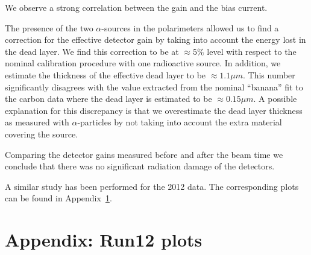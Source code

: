 \documentclass[a4paper,12pt]{article}
\begin{document}
We observe a strong correlation between the gain and the bias current.

The presence of the two $\alpha$-sources in the polarimeters allowed us to find
a correction for the effective detector gain by taking into account the energy
lost in the dead layer. We find this correction to be at $\approx 5\%$ level
with respect to the nominal calibration procedure with one radioactive source.
In addition, we estimate the thickness of the effective dead layer to be
$\approx 1.1\mu m$. This number significantly disagrees with the value extracted
from the nominal ``banana'' fit to the carbon data where the dead layer is
estimated to be $\approx 0.15\mu m$. A possible explanation for this discrepancy
is that we overestimate the dead layer thickness as measured with
$\alpha$-particles by not taking into account the extra material covering the
source.

Comparing the detector gains measured before and after the beam time we conclude
that there was no significant radiation damage of the detectors.

A similar study has been performed for the 2012 data. The corresponding plots
can be found in Appendix~\ref{sec:appendix_run12}.


\clearpage
\appendix
\section{Appendix: Run12 plots}
\label{sec:appendix_run12}
\end{document}
